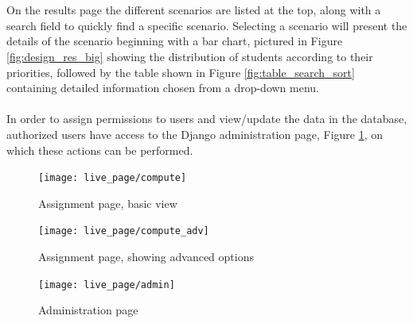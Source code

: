 \\\\
On the results page the different scenarios are listed at the top, along with a search field to quickly find a specific scenario. Selecting a scenario will present the details of the scenario beginning with a bar chart, pictured in Figure \ref{fig:design_res_big} showing the distribution of students according to their priorities, followed by the table shown in Figure \ref{fig:table_search_sort} containing detailed information chosen from a drop-down menu.
\\\\
In order to assign permissions to users and view/update the data in the database, authorized users have access to the Django administration page, Figure \ref{fig:design_admin}, on which these actions can be performed. 
\begin{figure}[H]
\centering
\vspace{-2cm}
\texttt{[image: live\_page/compute]}
\caption{Assignment page, basic view}
\label{fig:design_compute}
\vspace*{0.1cm}
\texttt{[image: live\_page/compute\_adv]}
\caption{Assignment page, showing advanced options}
\label{fig:design_compute_adv}
\vspace*{0.1cm}
\texttt{[image: live\_page/admin]}
\caption{Administration page}
\label{fig:design_admin}
\end{figure}

